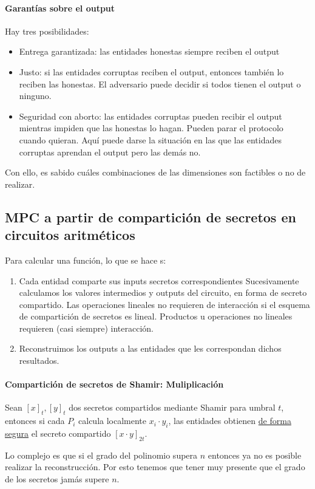   \paragraph{Garantías sobre el output}
  Hay tres posibilidades:
  \begin{itemize}
    \item Entrega garantizada: las entidades honestas siempre reciben el output 
    \item Justo: si las entidades corruptas reciben el output, entonces también lo reciben las honestas.
      El adversario puede decidir si todos tienen el output o ninguno.
    \item Seguridad con aborto: las entidades corruptas pueden recibir el output mientras impiden que las honestas lo hagan.
      Pueden parar el protocolo cuando quieran.
      Aquí puede darse la situación en las que las entidades corruptas aprendan el output pero las demás no.
  \end{itemize}

  \vspace{2em}
  Con ello, es sabido cuáles combinaciones de las dimensiones son factibles o no de realizar.

  \subsection{MPC a partir de compartición de secretos en circuitos aritméticos}
  Para calcular una función, lo que se hace s:
  \begin{enumerate}
    \item Cada entidad comparte sus inputs secretos correspondientes 
      Sucesivamente calculamos los valores intermedios y outputs del circuito, en forma
      de secreto compartido.
      Las operaciones lineales no requieren de interacción si el esquema de compartición de
      secretos es lineal.
      Productos u operaciones no lineales requieren (casi siempre) interacción.
    \item Reconstruimos los outputs a las entidades que les correspondan dichos resultados.
  \end{enumerate}

  \paragraph{Compartición de secretos de Shamir: Muliplicación}
  Sean $[x]_t, [y]_t$ dos secretos compartidos mediante Shamir para umbral $t$, entonces si cada $P_i$
  calcula localmente $x_i \cdot y_i$, las entidades obtienen \underline{de forma segura} el secreto compartido $[x \cdot y]_{2t}$.
  \begin{remark}
    Lo complejo es que si el grado del polinomio supera $n$ entonces ya no es posible realizar la reconstrucción.
    Por esto tenemos que tener muy presente que el grado de los secretos jamás supere $n$.
  \end{remark}

